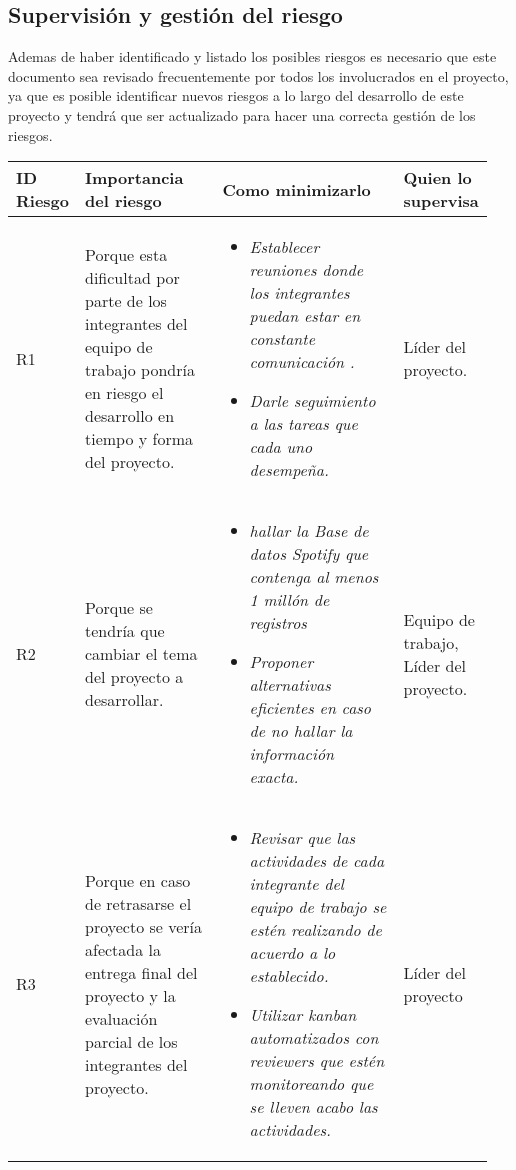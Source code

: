 \documentclass[12pt,a4paper]{article}
\begin{document}
\subsection{Supervisión y gestión del riesgo}
Ademas de haber identificado y listado los posibles riesgos es necesario que este documento sea revisado frecuentemente por todos los involucrados en el proyecto, ya que es posible identificar nuevos riesgos a lo largo del desarrollo de este proyecto y tendrá que ser actualizado para hacer una correcta gestión de los riesgos.
\vspace{1 cm}
\begin{table}[h!]
\begin{tabular}{|p{0.10\linewidth}|p{0.30\linewidth}|p{0.40\linewidth}|p{0.15\linewidth}|}
\hline
\textbf{ID Riesgo}&\textbf{Importancia del riesgo}&\textbf{Como minimizarlo}&\textbf{Quien lo supervisa}
\\\hline
R1&Porque esta dificultad por parte de los integrantes del equipo de trabajo pondría en riesgo el desarrollo en tiempo y forma del proyecto.&\begin{itemize}
\item \textit{Establecer reuniones donde los integrantes puedan estar en constante comunicación .}
\item \textit{Darle seguimiento a las tareas que cada uno desempeña.}
\end{itemize}
&Líder del proyecto.\\\hline

R2&Porque se tendría que cambiar el tema del proyecto a desarrollar.&\begin{itemize}
\item \textit{hallar la Base de datos Spotify que contenga al menos 1 millón de registros}
\item \textit{Proponer alternativas eficientes en caso de no hallar la información exacta.}
\end{itemize}&Equipo de trabajo, Líder del proyecto.\\\hline

R3&Porque en caso de retrasarse el proyecto se vería afectada la entrega final del proyecto y la evaluación parcial de los integrantes del proyecto.&\begin{itemize}
\item \textit{Revisar que las actividades de cada integrante del equipo de trabajo se estén realizando de acuerdo a lo establecido.}
\item \textit{Utilizar kanban automatizados con reviewers que estén monitoreando que se lleven acabo las actividades.}
\end{itemize} 
&Líder del proyecto\\\hline


\end{tabular}
\end{table}
\end{document}
